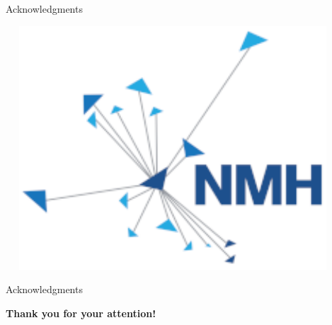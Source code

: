 \begin{frame}{Acknowledgments}
\begin{center}
~~
\includegraphics[scale=0.16]{tex-img/logo-nmh.pdf}
\end{center}
\end{frame} 
%
% 
\begin{frame}{Acknowledgments}
\begin{center}
    \huge \textbf{Thank you for your attention!}
\end{center}
\end{frame}